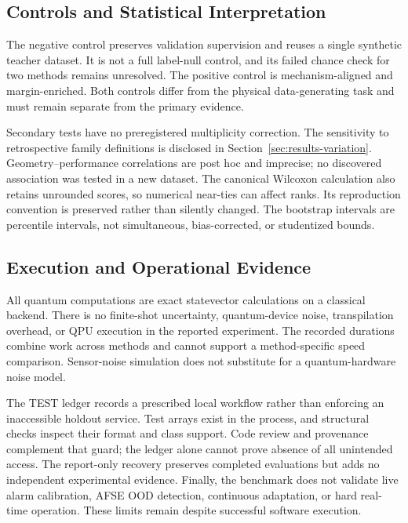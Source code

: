 \subsection{Controls and Statistical Interpretation}

The negative control preserves validation supervision and reuses a single synthetic teacher dataset. It is not a full label-null control, and its failed chance check for two methods remains unresolved. The positive control is mechanism-aligned and margin-enriched. Both controls differ from the physical data-generating task and must remain separate from the primary evidence.

Secondary tests have no preregistered multiplicity correction. The sensitivity to retrospective family definitions is disclosed in Section~\ref{sec:results-variation}. Geometry--performance correlations are post hoc and imprecise; no discovered association was tested in a new dataset. The canonical Wilcoxon calculation also retains unrounded scores, so numerical near-ties can affect ranks. Its reproduction convention is preserved rather than silently changed. The bootstrap intervals are percentile intervals, not simultaneous, bias-corrected, or studentized bounds.

\subsection{Execution and Operational Evidence}

All quantum computations are exact statevector calculations on a classical backend. There is no finite-shot uncertainty, quantum-device noise, transpilation overhead, or QPU execution in the reported experiment. The recorded durations combine work across methods and cannot support a method-specific speed comparison. Sensor-noise simulation does not substitute for a quantum-hardware noise model.

The TEST ledger records a prescribed local workflow rather than enforcing an inaccessible holdout service. Test arrays exist in the process, and structural checks inspect their format and class support. Code review and provenance complement that guard; the ledger alone cannot prove absence of all unintended access. The report-only recovery preserves completed evaluations but adds no independent experimental evidence. Finally, the benchmark does not validate live alarm calibration, AFSE OOD detection, continuous adaptation, or hard real-time operation. These limits remain despite successful software execution.
